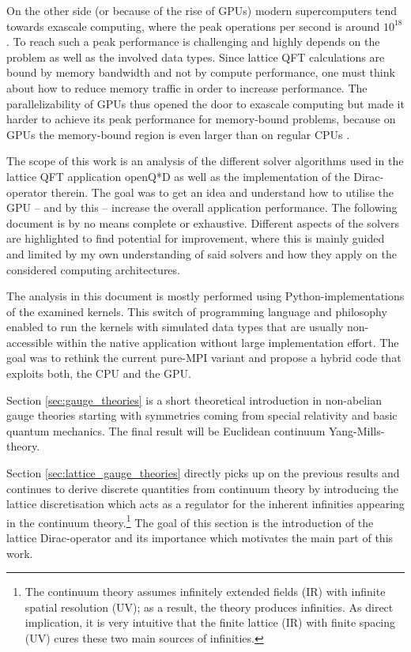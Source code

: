 \documentclass{article}
\theoremstyle{plain} %
\theoremstyle{convention} %
\theoremstyle{remark} %
\numberwithin{equation}{section}
\begin{document}
On the other side (or because of the rise of GPUs) modern supercomputers tend towards exascale computing, where the peak operations per second is around $10^{18}$ \cite{top500}. To reach such a peak performance is challenging and highly depends on the problem as well as the involved data types. Since lattice QFT calculations are bound by memory bandwidth and not by compute performance, one must think about how to reduce memory traffic in order to increase performance. The parallelizability of GPUs thus opened the door to exascale computing but made it harder to achieve its peak performance for memory-bound problems, because on GPUs the memory-bound region is even larger than on regular CPUs \cite{davis2012}.

The scope of this work is an analysis of the different solver algorithms used in the lattice QFT application openQ*D \cite{openqxd} as well as the implementation of the Dirac-operator therein. The goal was to get an idea and understand how to utilise the GPU  -- and by this -- increase the overall application performance. The following document is by no means complete or exhaustive. Different aspects of the solvers are highlighted to find potential for improvement, where this is mainly guided and limited by my own understanding of said solvers and how they apply on the considered computing architectures.

The analysis in this document is mostly performed using Python-implementations of the examined kernels. This switch of programming language and philosophy enabled to run the kernels with simulated data types that are usually non-accessible within the native application without large implementation effort. The goal was to rethink the current pure-MPI variant and propose a hybrid code that exploits both, the CPU and the GPU.

Section \ref{sec:gauge_theories} is a short theoretical introduction in non-abelian gauge theories starting with symmetries coming from special relativity and basic quantum mechanics. The final result will be Euclidean continuum Yang-Mills-theory.

Section \ref{sec:lattice_gauge_theories} directly picks up on the previous results and continues to derive discrete quantities from continuum theory by introducing the lattice discretisation which acts as a regulator for the inherent infinities appearing in the continuum theory.\footnote{The continuum theory assumes infinitely extended fields (IR) with infinite spatial resolution (UV); as a result, the theory produces infinities. As direct implication, it is very intuitive that the finite lattice (IR) with finite spacing (UV) cures these two main sources of infinities.} The goal of this section is the introduction of the lattice Dirac-operator and its importance which motivates the main part of this work.
\end{document}
